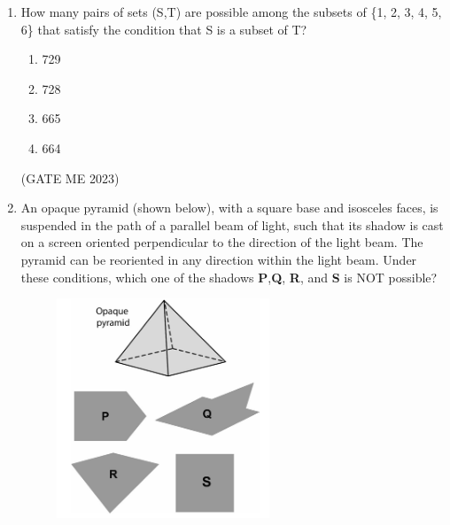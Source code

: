 \documentclass[journal]{IEEEtran}
\begin{document}
\begin{enumerate}
(iv) I decided I would rather wander down the passage.

\begin{enumerate}
    \item (iv), (i), (iii), (ii)
    \item (iii), (i), (ii), (iv)
    \item (ii), (i), (iv), (iii)
    \item (i), (iii), (ii), (iv)
\end{enumerate}
\hfill (GATE ME 2023)

\item How many pairs of sets (S,T) are possible among the subsets of \{1, 2, 3, 4, 5, 6\} that satisfy the condition that S is a subset of T?

\begin{enumerate}
    \item 729
    \item 728
    \item 665
    \item 664
\end{enumerate}
\hfill (GATE ME 2023)

\item An opaque pyramid (shown below), with a square base and isosceles faces, is suspended in the path of a parallel beam of light, such that its shadow is cast on a screen oriented perpendicular to the direction of the light beam. The pyramid can be reoriented in any direction within the light beam. Under these conditions, which one of the shadows \textbf{P},\textbf{Q}, \textbf{R}, and \textbf{S} is NOT possible?
\begin{figure}[H]
\centering
\includegraphics[width=0.6\textwidth]{Fig 3.png}
\caption{}
\label{fig:question10}
\end{figure}


\end{enumerate}
\end{document}
